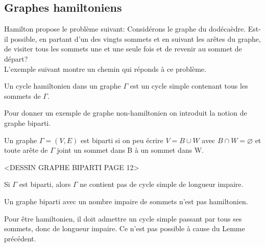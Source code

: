 \subsection{Graphes hamiltoniens}

Hamilton propose le problème suivant: Considérons le graphe du dodécaèdre. Est-il possible, en partant d'un des vingts sommets et en suivant les arêtes du graphe, de visiter tous les sommets une et une seule fois et de revenir au sommet de départ? \\

L'exemple suivant montre un chemin qui réponds à ce problème. \\

\begin{exmp}
\end{exmp}



\begin{defn}
Un cycle hamiltonien dans un graphe $\Gamma$ est un cycle simple contenant tous les sommets de $\Gamma$. \\
\end{defn}

Pour donner un exemple de graphe non-hamiltonien on introduit la notion de graphe biparti. 

\begin{defn}
Un graphe $\Gamma = (V,E)$ est biparti si on peu écrire $V=B \cup W$ avec $B \cap W = \varnothing $ et toute arête de $\Gamma$ joint un sommet dans B à un sommet dans W.\\
\end{defn}

\begin{exmp}
<DESSIN GRAPHE BIPARTI PAGE 12>
\end{exmp}

\begin{lemme}
Si $\Gamma$ est biparti, alors $\Gamma$ ne contient pas de cycle simple de longueur impaire.
\end{lemme}

\begin{thrm}
Un graphe biparti avec un nombre impaire de sommets n'est pas hamiltonien.
\end{thrm}

\begin{demo}
Pour être hamiltonien, il doit admettre un cycle simple passant par tous ses sommets, donc de longueur impaire. Ce n'est pas possible à cause du Lemme précédent.
\end{demo}

